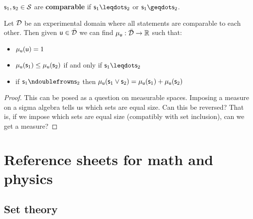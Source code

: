 \documentclass[11pt,letterpaper,fleqn]{memoir} %
\begin{document}
\begin{defn}
	$\stmt_1, \stmt_2 \in \logCtx$ are \textbf{comparable} if $\stmt_1 \finer \stmt_2$ or $\stmt_1 \coarser \stmt_2$.
\end{defn}

\begin{thrm}
	Let $\edomain$ be an experimental domain where all statements are comparable to each other. Then given $\stmt[u] \in \tdomain$ we can find $\mu_{\stmt[u]} : \tdomain \to \mathbb{R}$ such that:
	\begin{itemize}
		\item $\mu_{\stmt[u]}(\stmt[u]) = 1$
		\item $\mu_{\stmt[u]}(\stmt_1) \leq \mu_{\stmt[u]}(\stmt_2)$ if and only if $\stmt_1 \finer \stmt_2$
		\item if $\stmt_1 \ncomp \stmt_2$ then $\mu_{\stmt[u]}(\stmt_1 \OR \stmt_2) =  \mu_{\stmt[u]}(\stmt_1) + \mu_{\stmt[u]}(\stmt_2)$
	\end{itemize}
\end{thrm}
\begin{proof}
	This can be posed as a question on measurable spaces. Imposing a measure on a sigma algebra tells us which sets are equal size. Can this be reversed? That is, if we impose which sets are equal size (compatibly with set inclusion), can we get a measure?
\end{proof}


\appendix

\chapter{Reference sheets for math and physics}

\section{Set theory}
\end{document}
